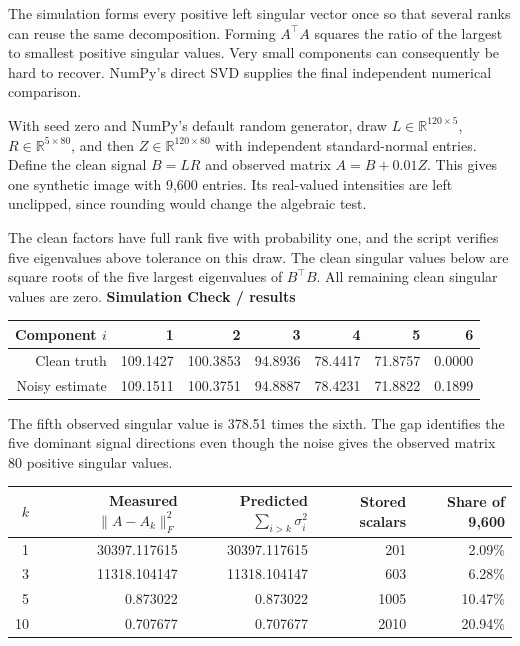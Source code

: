 \documentclass[11pt,letterpaper]{article}
\newcommand{\head}[1]{{\color{ink}\LARGE\bfseries #1}\par\medskip}
\newcommand{\subhead}[1]{\par\medskip{\large\bfseries\color{accent}#1}\par}
\begin{document}
The simulation forms every positive left singular vector once so that several ranks can reuse the same decomposition. Forming $A^\top A$ squares the ratio of the largest to smallest positive singular values. Very small components can consequently be hard to recover. NumPy's direct SVD supplies the final independent numerical comparison.
\subhead{Simulation Check}
With seed zero and NumPy's default random generator, draw $L\in\mathbb R^{120\times5}$, $R\in\mathbb R^{5\times80}$, and then $Z\in\mathbb R^{120\times80}$ with independent standard-normal entries. Define the clean signal $B=LR$ and observed matrix $A=B+0.01Z$. This gives one synthetic image with 9,600 entries. Its real-valued intensities are left unclipped, since rounding would change the algebraic test.\par
The clean factors have full rank five with probability one, and the script verifies five eigenvalues above tolerance on this draw. The clean singular values below are square roots of the five largest eigenvalues of $B^\top B$. All remaining clean singular values are zero.
\newpage
\head{Simulation Check \textnormal{\large / results}}
\begin{center}
\begin{tabular}{@{}rrrrrrr@{}}\toprule
Component $i$ & 1 & 2 & 3 & 4 & 5 & 6\\\midrule
Clean truth &109.1427&100.3853&94.8936&78.4417&71.8757&0.0000\\
Noisy estimate &109.1511&100.3751&94.8887&78.4231&71.8822&0.1899\\\bottomrule
\end{tabular}
\end{center}
The fifth observed singular value is 378.51 times the sixth. The gap identifies the five dominant signal directions even though the noise gives the observed matrix 80 positive singular values.
\begin{center}
\begin{tabular}{@{}rrrrr@{}}\toprule
$k$ & Measured $\|A-A_k\|_F^2$ & Predicted $\sum_{i>k}\sigma_i^2$ & Stored scalars & Share of 9,600\\\midrule
1 &30397.117615&30397.117615&201&2.09\%\\
3 &11318.104147&11318.104147&603&6.28\%\\
5 &0.873022&0.873022&1005&10.47\%\\
10&0.707677&0.707677&2010&20.94\%\\\bottomrule
\end{tabular}
\end{center}
\end{document}
